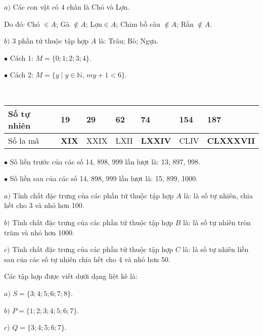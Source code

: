 \begin{Answer}{1}
			$a)$ Các con vật có $4$ chân là Chó và Lợn.
			
			Do đó: Chó $\in A$; Gà $\notin A$; Lợn$ \in A$; Chim bồ câu $\notin A$; Rắn $\notin A$.
			
			$b)$ 3 phần tử thuộc tập hợp $A$ là: Trâu; Bò; Ngựa.
	
\end{Answer}
\begin{Answer}{3}
		$\bullet$	Cách 1: $M = \{0; 1; 2; 3; 4\}$.
		
		$\bullet$	Cách 2: $M = \{ y \mid y \in \mathbb{N},\, m y + 1 < 6\}$.
	
\end{Answer}
\begin{Answer}{4}
		\,\\
			\renewcommand{\arraystretch}{1.1}
			\begin{tabularx}{\textwidth}{|p{2cm}|*{6}{Y|} }
				\hline
				Số tự nhiên&	19&	\textbf{29} & \textbf{62}	&	74&	\textbf{154}&	187\\
				\hline
				Số la mã&	\textbf{XIX}&	XXIX&	LXII&	\textbf{LXXIV}&	CLIV&	\textbf{CLXXXVII}\\
				\hline
			\end{tabularx}
	
\end{Answer}
\begin{Answer}{5}
		$\bullet$	Số liền trước của các số 14, 898, 999 lần lượt là: 13, 897, 998.
		
		$\bullet$	Số liền sau của các số 14, 898, 999 lần lượt là: 15, 899, 1000.
	
\end{Answer}
\begin{Answer}{6}
		$a)$	Tính chất đặc trưng của các phần tử thuộc tập hợp $A$ là: là số tự nhiên, chia hết cho 3 và nhỏ hơn 100.
		
		$b)$	Tính chất đặc trưng của các phần tử thuộc tập hợp $B$ là: là số tự nhiên tròn trăm và nhỏ hơn 1000.
		
		$c)$	Tính chất đặc trưng của các phần tử thuộc tập hợp $C$ là: là số tự nhiên liền sau của các số tự nhiên chia hết cho 4 và nhỏ hơn 50.
	
\end{Answer}
\begin{Answer}{7}
		Các tập hợp được viết dưới dạng liệt kê là:
		
		$a)$ $S = \{3; 4; 5; 6; 7; 8\}$.
		
		$b)$ $P = \{1; 2; 3; 4; 5; 6; 7\}$.
		
		$c)$ $Q = \{3; 4; 5; 6; 7\}$.
	
\end{Answer}
